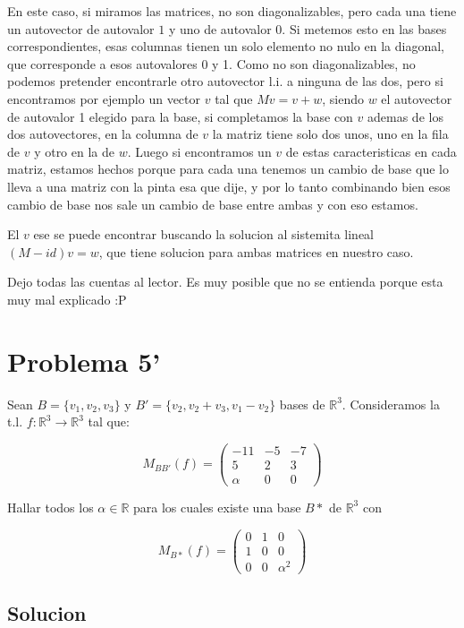 \documentclass{article}
\begin{document}
En este caso, si miramos las matrices, no son diagonalizables, pero cada una tiene un autovector de autovalor $1$ y uno de autovalor $0$.
Si metemos esto en las bases correspondientes, esas columnas tienen un solo elemento no nulo en la diagonal, que corresponde a esos autovalores
0 y 1. Como no son diagonalizables, no podemos pretender encontrarle otro autovector l.i. a ninguna de las dos, pero si encontramos por ejemplo
un vector $v$ tal que $Mv = v + w$, siendo $w$ el autovector de autovalor 1 elegido para la base, si completamos la base con $v$ ademas de
los dos autovectores, en la columna de $v$ la matriz tiene solo dos unos, uno en la fila de $v$ y otro en la de $w$. Luego si encontramos
un $v$ de estas caracteristicas en cada matriz, estamos hechos porque para cada una tenemos un cambio de base que lo lleva a una matriz con
la pinta esa que dije, y por lo tanto combinando bien esos cambio de base nos sale un cambio de base entre ambas y con eso estamos.

El $v$ ese se puede encontrar buscando la solucion al sistemita lineal $(M-id)v = w$, que tiene solucion para ambas matrices en nuestro caso.

Dejo todas las cuentas al lector. Es muy posible que no se entienda porque esta muy mal explicado :P

\section{Problema 5'}

Sean $B = \{ v_1,v_2,v_3 \}$ y $B' = \{v_2,v_2+v_3,v_1-v_2\}$ bases de $\mathbb{R}^3$. Consideramos la t.l. 
$f : \mathbb{R}^3 \rightarrow \mathbb{R}^3$
tal que:

$$M_{BB'}(f) = \begin{pmatrix} -11 & -5 & -7 \\ 5 & 2 & 3 \\ \alpha & 0 & 0 \end{pmatrix}$$

Hallar todos los $\alpha \in \mathbb{R}$ para los cuales existe una base $B*$ de $\mathbb{R}^3$ con

$$M_{B*}(f) = \begin{pmatrix} 0 & 1 & 0 \\ 1 & 0 & 0 \\ 0 & 0 & \alpha^2 \end{pmatrix}$$

\subsection{Solucion}
\end{document}
